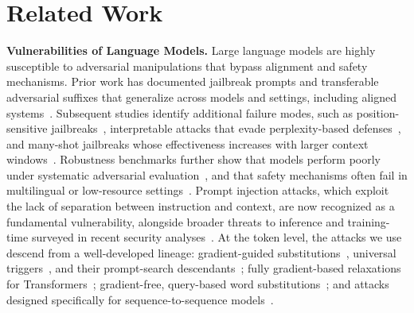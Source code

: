 \documentclass{article}
\newcommand{\R}{\mathbb{R}}
\theoremstyle{plain}
\theoremstyle{definition}
\theoremstyle{remark}
\begin{document}

\section{Related Work}

\textbf{Vulnerabilities of Language Models.}
Large language models are highly susceptible to adversarial manipulations that bypass alignment and safety mechanisms. Prior work has documented jailbreak prompts and transferable adversarial suffixes that generalize across models and settings, including aligned systems~\citep{Zou2023UniversalTransferableAttacksOnAlignedLLMs}. Subsequent studies identify additional failure modes, such as position-sensitive jailbreaks~\citep{wang2025vulnerability}, interpretable attacks that evade perplexity-based defenses~\citep{Zhu2023AutoDAN}, and many-shot jailbreaks whose effectiveness increases with larger context windows~\citep{anil2024many}. Robustness benchmarks further show that models perform poorly under systematic adversarial evaluation~\citep{Wang2021AdvGLUE}, and that safety mechanisms often fail in multilingual or low-resource settings~\citep{deng2024multilingual}. Prompt injection attacks, which exploit the lack of separation between instruction and context, are now recognized as a fundamental vulnerability, alongside broader threats to inference and training-time surveyed in recent security analyses~\citep{li2025security}.
At the token level, the attacks we use descend from a well-developed lineage: gradient-guided substitutions~\citep{ebrahimi2018hotflip}, universal triggers~\citep{wallace2019universal}, and their prompt-search descendants~\citep{shin2020autoprompt}; fully gradient-based relaxations for Transformers~\citep{guo2021gradient}; gradient-free, query-based word substitutions~\citep{jin2020bert}; and attacks designed specifically for sequence-to-sequence models~\citep{cheng2020seq2sick}.
\end{document}
